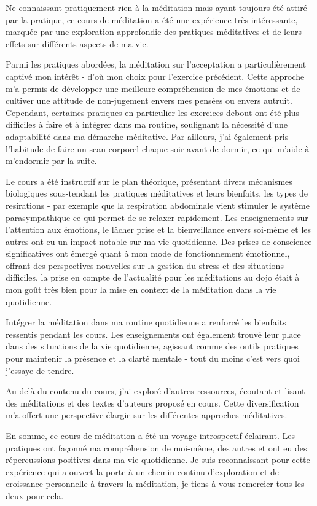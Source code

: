\documentclass[a4paper,12pt]{article}
\begin{document}
Ne connaissant pratiquement rien à la méditation mais ayant toujours été attiré par la pratique, ce cours de méditation a été une expérience très intéressante, marquée par une exploration approfondie des pratiques méditatives et de leurs effets sur différents aspects de ma vie. 

Parmi les pratiques abordées, la méditation sur l'acceptation a particulièrement captivé mon intérêt - d'où mon choix pour l'exercice précédent. Cette approche m'a permis de développer une meilleure compréhension de mes émotions et de cultiver une attitude de non-jugement envers mes pensées ou envers autruit. Cependant, certaines pratiques en particulier les exercices debout ont été plus difficiles à faire et à intégrer dans ma routine, soulignant la nécessité d'une adaptabilité dans ma démarche méditative. Par ailleurs, j'ai également pris l'habitude de faire un scan corporel chaque soir avant de dormir, ce qui m'aide à m'endormir par la suite.

Le cours a été instructif sur le plan théorique, présentant divers mécanismes biologiques sous-tendant les pratiques méditatives et leurs bienfaits, les types de resirations - par exemple que la respiration abdominale vient stimuler le système parasympathique ce qui permet de se relaxer rapidement. Les enseignements sur l'attention aux émotions, le lâcher prise et la bienveillance envers soi-même et les autres ont eu un impact notable sur ma vie quotidienne. Des prises de conscience significatives ont émergé quant à mon mode de fonctionnement émotionnel, offrant des perspectives nouvelles sur la gestion du stress et des situations difficiles, la prise en compte de l'actualité pour les méditations au dojo était à mon goût très bien pour la mise en context de la méditation dans la vie quotidienne.

Intégrer la méditation dans ma routine quotidienne a renforcé les bienfaits ressentis pendant les cours. Les enseignements ont également trouvé leur place dans des situations de la vie quotidienne, agissant comme des outils pratiques pour maintenir la présence et la clarté mentale - tout du moins c'est vers quoi j'essaye de tendre.

Au-delà du contenu du cours, j'ai exploré d'autres ressources, écoutant et lisant des méditations et des textes d'auteurs proposé en cours. Cette diversification m'a offert une perspective élargie sur les différentes approches méditatives.

En somme, ce cours de méditation a été un voyage introspectif éclairant. Les pratiques ont façonné ma compréhension de moi-même, des autres et ont eu des répercussions positives dans ma vie quotidienne. Je suis reconnaissant pour cette expérience qui a ouvert la porte à un chemin continu d'exploration et de croissance personnelle à travers la méditation, je tiens à vous remercier tous les deux pour cela.
\end{document}
